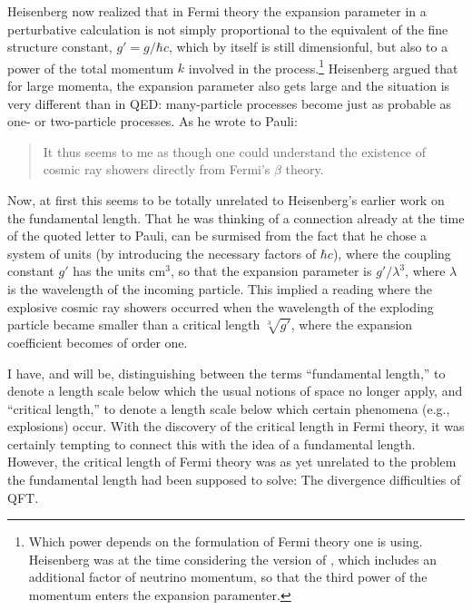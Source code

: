 \documentclass[12pt,a4paper]{article}
\begin{document}
Heisenberg now realized that in Fermi theory the expansion parameter in a perturbative calculation is not simply proportional to the equivalent of the fine structure constant, $g' = g/\hbar c$, which by itself is still dimensionful, but  also to a power of the total momentum $k$ involved in the process.\footnote{Which power depends on the formulation of Fermi theory one is using. Heisenberg was at the time considering the version of \cite{konopinski_1935_on-the-fermi}, which includes an additional factor of neutrino momentum, so that the third power of the momentum enters the expansion paramenter.} Heisenberg argued that for large momenta, the expansion parameter also gets large and the situation is very different than in  QED: many-particle processes become just as probable as one- or two-particle processes. As he wrote to Pauli:

\begin{quote}
It thus seems to me as though one could understand the existence of cosmic ray showers directly from Fermi's $\beta$ theory.
\end{quote}

Now, at first this seems to be totally unrelated to Heisenberg's earlier work on the fundamental length. That he was thinking of a connection already at the time of the quoted letter to Pauli, can be surmised from the fact that he chose a system of units (by introducing the necessary factors of $\hbar c$), where the coupling constant $g'$ has the units $\mathrm{cm}^3$, so that the expansion parameter is $g'/\lambda^3$, where $\lambda$ is the wavelength of the incoming particle. This implied a reading where the explosive cosmic ray showers occurred when the wavelength of the exploding particle became smaller than a critical length $\sqrt[3]{g'}$, where the expansion coefficient becomes of order one.

I have, and will be, distinguishing between the terms ``fundamental length,'' to denote a length scale below which the usual notions of space no longer apply, and ``critical length,'' to denote a length scale below which certain phenomena (e.g., explosions) occur. With the discovery of the critical length in Fermi theory, it was certainly tempting to connect this with the idea of a fundamental length. However, the critical length of Fermi theory was as yet unrelated to the problem the fundamental length had been supposed to solve: The divergence difficulties of QFT.
\end{document}
